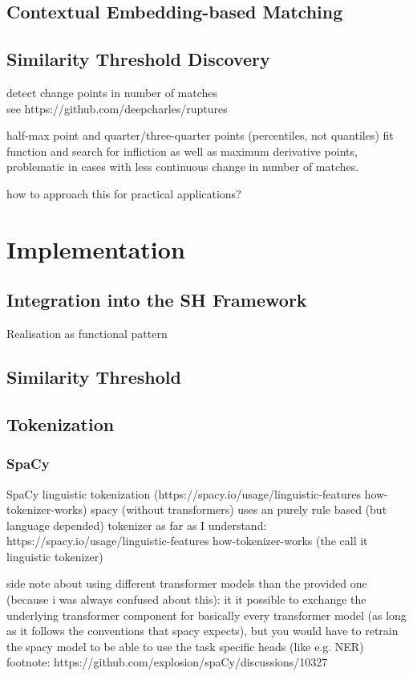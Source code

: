 \documentclass[11pt]{scrreprt}
\begin{document}
\section{Contextual Embedding-based Matching}


\section{Similarity Threshold Discovery}
detect change points in number of matches \\ 
see https://github.com/deepcharles/ruptures

half-max point and quarter/three-quarter points (percentiles, not quantiles)
fit function and search for infliction as well as maximum derivative points,
problematic in cases with less continuous change in number of matches.

how to approach this for practical applications?


\chapter{Implementation}

\section{Integration into the SH Framework}
Realisation as functional pattern

\section{Similarity Threshold}
\label{sec:similarity-threshold}


\section{Tokenization}

\subsection{SpaCy}
SpaCy linguistic tokenization (https://spacy.io/usage/linguistic-features how-tokenizer-works)
spacy (without transformers) uses an purely rule based (but language depended) tokenizer as far as I understand: https://spacy.io/usage/linguistic-features how-tokenizer-works (the call it linguistic tokenizer)

side note about using different transformer models than the provided one (because i was always confused about this):
it it possible to exchange the underlying transformer component for basically every transformer model (as long as it follows the conventions that spacy expects), but you would have to retrain the spacy model to be able to use the task specific heads (like e.g. NER)
footnote: https://github.com/explosion/spaCy/discussions/10327
\end{document}
